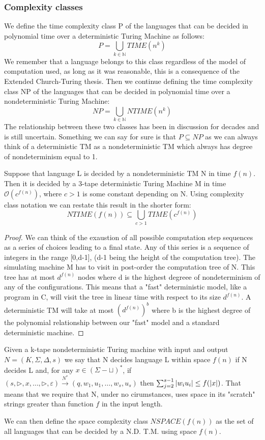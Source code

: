 \subsubsection{Complexity classes}
We define the time complexity class P of the languages that can be decided in polynomial time over a deterministic Turing Machine as follows:
\[ 
    P = \bigcup_{k\in \mathbb{N}}{TIME(n^k)}
\]We remember that a language belongs to this class regardless of the model of computation used, as long as it was reasonable, this is a consequence of the Extended Church-Turing thesis. Then we continue defining the time complexity class NP of the languages that can be decided in polynomial time over a nondeterministic Turing Machine:
\[ 
    NP = \bigcup_{k\in \mathbb{N}}{NTIME(n^k)}
\]The relationship between these two classes has been in discussion for decades and is still uncertain. Something we can say for sure is that $P \subseteq NP$ as we can always think of a deterministic TM as a nondeterministic TM which always has degree of nondeterminism equal to 1.
\begin{theorem}
    Suppose that language L is decided by a nondeterministic TM N in time $f(n)$. Then it is decided by a 3-tape deterministic Turing Machine M in time $\mathcal{O}(c^{f(n)})$, where $c> 1$ is some constant depending on N. Using complexity class notation we can restate this result in the shorter form:
    \[ 
        NTIME(f(n)) \subseteq \bigcup_{c>1}{TIME(c^{f(n)})} 
    \]
    \begin{proof}
        We can think of the exaustion of all possible computation step sequences as a series of choices leading to a final state. Any of this series is a sequence of integers in the range [0,d-1], (d-1 being the height of the computation tree). The simulating machine M has to visit in post-order the computation tree of N. This tree has at most $d^{f(n)}$ nodes where d is the highest degreee of nondeterminism of any of the configurations. This means that a "fast" deterministic model, like a program in C, will visit the tree in linear time with respect to its size $d^{f(n)}$. A deterministic TM will take at most $(d^{f(n)})^b$ where b is the highest degree of the polynomial relationship between our "fast" model and a standard deterministic machine. 
    \end{proof}
\end{theorem}
\begin{definition}
    Given a k-tape nondeterministic Turing machine with input and output $N=(K, \Sigma, \Delta, s)$ we say that N decides language L within space $f(n)$ if N decides L and, for any $x\in (\Sigma-{\sqcup})^*$, if $(s,\triangleright,x,\ldots,\triangleright,\varepsilon) \overset{N^*}{\longrightarrow}(q,w_1,u_1,\ldots,w_s,u_s)$ then $\sum_{j=2}^{s-1}{\left\lvert w_iu_i\right\rvert}\leq f(\left\lvert x\right\rvert)$. That means that we require that N, under no cirumstances, uses space in its "scratch" strings greater than function $f$ in the input length. 
\end{definition}
We can then define the space complexity class $NSPACE(f(n))$ as the set of all languages that can be decided by a N.D. T.M. using space $f(n)$.

